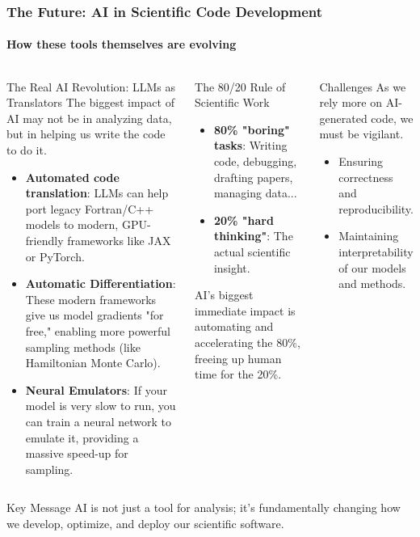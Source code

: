 \documentclass[aspectratio=169]{beamer}
\newcommand{\keyterm}[1]{\textbf{\textcolor{blue!70!black}{#1}}}
\begin{document}
\begin{frame}
    \frametitle{The Future: AI in Scientific Code Development}
    \framesubtitle{How these tools themselves are evolving}
    \begin{columns}[T]
        \begin{block}{The Real AI Revolution: LLMs as Translators}
            The biggest impact of AI may not be in analyzing data, but in helping us write the code to do it.
            \begin{itemize}
                \item \keyterm{Automated code translation}: LLMs can help port legacy Fortran/C++ models to modern, GPU-friendly frameworks like JAX or PyTorch.
                \item \keyterm{Automatic Differentiation}: These modern frameworks give us model gradients "for free," enabling more powerful sampling methods (like Hamiltonian Monte Carlo).
                \item \keyterm{Neural Emulators}: If your model is very slow to run, you can train a neural network to emulate it, providing a massive speed-up for sampling.
            \end{itemize}
        \end{block}
        
        \begin{block}{The 80/20 Rule of Scientific Work}
            \begin{itemize}
                \item \textbf{80\% "boring" tasks}: Writing code, debugging, drafting papers, managing data...
                \item \textbf{20\% "hard thinking"}: The actual scientific insight.
            \end{itemize}
            AI's biggest immediate impact is automating and accelerating the 80\%, freeing up human time for the 20\%.
        \end{block}
        
        \begin{block}{Challenges}
            As we rely more on AI-generated code, we must be vigilant.
            \begin{itemize}
                \item Ensuring correctness and reproducibility.
                \item Maintaining interpretability of our models and methods.
            \end{itemize}
        \end{block}
    \end{columns}
    
    \begin{alertblock}{Key Message}
        AI is not just a tool for analysis; it's fundamentally changing how we develop, optimize, and deploy our scientific software.
    \end{alertblock}
\end{frame}
\end{document}
